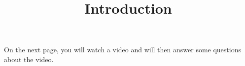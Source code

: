 \documentclass[handout]{ximera}
\title{Introduction}
\begin{document}
\begin{abstract} %
\end{abstract}

\maketitle

On the next page, you will watch a video and will then answer some questions about the video.
\end{document}
